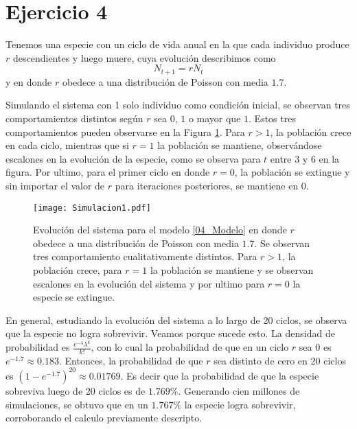 \section*{Ejercicio 4}
\graphicspath{{Figuras/ej_04/}}

Tenemos una especie con un ciclo de vida anual en la que cada individuo produce $r$ descendientes y luego muere, cuya evolución describimos como
\begin{equation}
    N_{t+1} = r N_{t}
    \label{04_Modelo}
\end{equation}
y en donde $r$ obedece a una distribución de Poisson con media $1.7$.

Simulando el sistema con 1 solo individuo como condición inicial, se observan tres comportamientos distintos según $r$ sea $0$, $1$ o mayor que $1$. Estos tres comportamientos pueden observarse en la Figura \ref{04_Simulacion}. Para $r>1$, la población crece en cada ciclo, mientras que si $r=1$ la población se mantiene, observándose escalones en la evolución de la especie, como se observa para $t$ entre 3 y 6 en la figura. Por ultimo, para el primer ciclo en donde $r=0$, la población se extingue y sin importar el valor de $r$ para iteraciones posteriores, se mantiene en $0$. 

\begin{figure}
    \centering
    \texttt{[image: Simulacion1.pdf]}
    \caption{Evolución del sistema para el modelo \ref{04_Modelo} en donde $r$ obedece a una distribución de Poisson con media $1.7$. Se observan tres comportamiento cualitativamente distintos. Para $r>1$, la población crece, para $r=1$ la población se mantiene y se observan escalones en la evolución del sistema y por ultimo para $r=0$ la especie se extingue.}
    \label{04_Simulacion}
\end{figure}

En general, estudiando la evolución del sistema a lo largo de 20 ciclos, se observa que la especie no logra sobrevivir. Veamos porque sucede esto. La densidad de probabilidad es $\frac{e^{-\lambda}\lambda^{k}}{k!}$, con lo cual la probabilidad de que en un ciclo $r$ sea $0$ es $e^{-1.7}\approx0.183$. Entonces, la probabilidad de que $r$ sea distinto de cero en 20 ciclos es $(1-e^{-1.7})^{20}\approx0.01769$. Es decir que la probabilidad de que la especie sobreviva luego de 20 ciclos es de $1.769\%$. Generando cien millones de simulaciones, se obtuvo que en un $1.767\%$ la especie logra sobrevivir, corroborando el calculo previamente descripto. 